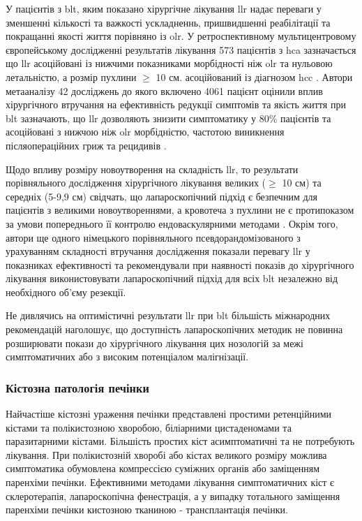 У пацієнтів з \acrshort{blt}, яким показано хірургічне лікування \acrshort{llr} надає переваги у зменшенні кількості та важкості ускладненнь, пришвидшенні реабілітації та покращанні якості життя порівняно із \acrshort{olr}. У ретроспективному мультицентровому європейському дослідженні результатів лікування 573 пацієнтів з \acrshort{hca} зазначається що \acrshort{llr} асоційовані із нижчими показниками морбідності ніж \acrshort{olr} та нульовою летальністю, а розмір пухлини $\geq$ 10 см. асоційований із діагнозом \acrshort{hcc} \cite{Laurent2016}. Автори метааналізу 42 досліджень до якого включено 4061 пацієнт оцінили вплив хірургічного втручання на ефективність редукції симптомів та якість життя при \acrshort{blt} зазначають, що \acrshort{llr} дозволяють знизити симптоматику у 80\% пацієнтів та асоційовані з нижчою ніж \acrshort{olr} морбідністю, частотою виникнення післяопераційних гриж та рецидивів \cite{VanRosmalen2019}. 

Щодо впливу розміру новоутворення на складність \acrshort{llr}, то результати порівняльного дослідження хірургічного лікування великих ($\geq$ 10 см) та середніх (5-9,9 см) свідчать, що лапароскопічний підхід є безпечним для пацієнтів з великими новоутвореннями, а кровотеча з пухлини не є протипоказом за умови попереднього її контролю ендоваскулярними методами \cite{McKay2020}. Окрім того, автори ще одного німецького порівняльного псевдорандомізованого з урахуванням складності втручання дослідження показали перевагу \acrshort{llr} у показниках ефективності та рекомендували при наявності показів до хірургічного лікування виконистовувати лапароскопічний підхід для всіх \acrshort{blt} незалежно від необхідного об'єму резекції.

Не дивлячись на оптимістичні результати \acrshort{llr} при \acrshort{blt} більшість міжнародних рекомендацій наголошує, що доступність лапароскопічних методик не повинна розширювати покази до хірургічного лікування цих нозологій за межі симптоматичних або з високим потенціалом малігнізації.

\subsubsection{Кістозна патологія печінки}

Найчастіше кістозні ураження печінки представлені простими ретенційними кістами та полікистозною хворобою, біліарними цистаденомами та паразитарними кістами. Більшість простих кіст асимптоматичні та не потребують лікування. При полікистозній хворобі або кістах великого розміру можлива симптоматика обумовлена компрессією суміжних органів або заміщенням паренхіми печінки. Ефективними методами лікування симптоматичних кіст є склеротерапія, лапароскопічна фенестрація, а у випадку тотального заміщення паренхіми печінки кистозною тканиною - трансплантація печінки. 

